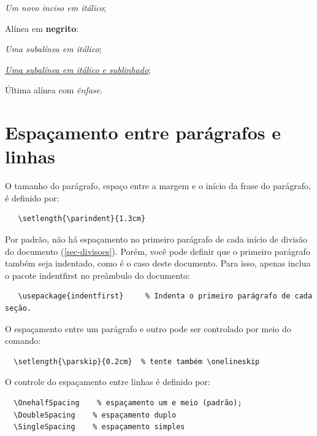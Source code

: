 \begin{alineas}
  \begin{incisos}
    \item \textit{Um novo inciso em itálico};
  \end{incisos}

  \item Alínea em \textbf{negrito}:

  \begin{subalineas}
    \item \textit{Uma subalínea em itálico};
    \item \underline{\textit{Uma subalínea em itálico e sublinhado}};
  \end{subalineas}

  \item Última alínea com \emph{ênfase}.

\end{alineas}

\section{Espaçamento entre parágrafos e linhas}%
O tamanho do parágrafo, espaço entre a margem
e o início da frase do parágrafo, é definido por:

\begin{verbatim}
   \setlength{\parindent}{1.3cm}
\end{verbatim}%
Por padrão, não há espaçamento no
primeiro parágrafo de cada início de divisão do documento
(\autoref{sec-divisoes}). Porém, você pode definir que o primeiro parágrafo
também seja indentado, como é o caso deste documento. Para isso, apenas inclua o
pacote \textsf{indentfirst} no preâmbulo do documento:

\begin{verbatim}
   \usepackage{indentfirst}     % Indenta o primeiro parágrafo de cada seção.
\end{verbatim}%
O espaçamento entre um parágrafo e outro
pode ser controlado por meio do comando:

\begin{verbatim}
  \setlength{\parskip}{0.2cm}  % tente também \onelineskip
\end{verbatim}%
O controle do espaçamento entre linhas é
definido por:

\begin{verbatim}
  \OnehalfSpacing    % espaçamento um e meio (padrão);
  \DoubleSpacing    % espaçamento duplo
  \SingleSpacing    % espaçamento simples
\end{verbatim}

